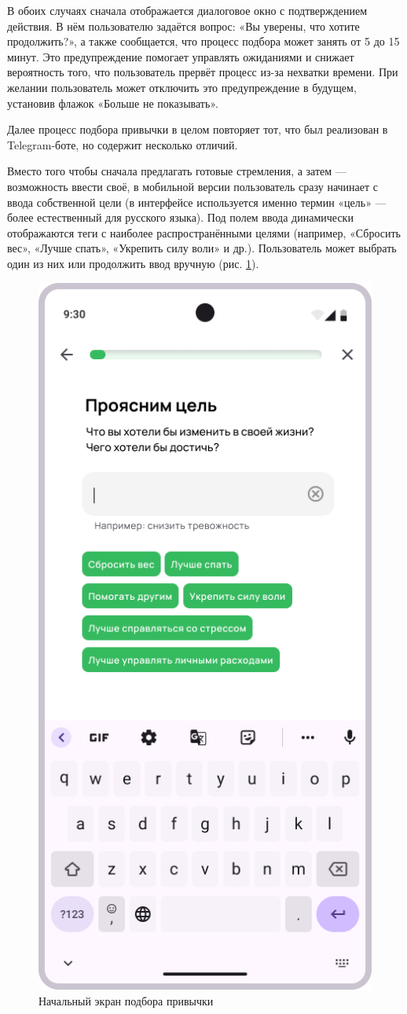 \documentclass[pdflatex,sn-mathphys-num]{sn-jnl}%
\theoremstyle{thmstyleone}%
\theoremstyle{thmstyletwo}%
\theoremstyle{thmstylethree}%
\begin{document}
В обоих случаях сначала отображается диалоговое окно с подтверждением действия. В нём пользователю задаётся вопрос:
«Вы уверены, что хотите продолжить?», а также сообщается, что процесс подбора может занять от 5 до 15 минут. Это предупреждение помогает управлять ожиданиями и снижает вероятность того, что пользователь прервёт процесс из-за нехватки времени. При желании пользователь может отключить это предупреждение в будущем, установив флажок «Больше не показывать».

Далее процесс подбора привычки в целом повторяет тот, что был реализован в Telegram-боте, но содержит несколько отличий.

Вместо того чтобы сначала предлагать готовые стремления, а затем — возможность ввести своё, в мобильной версии пользователь сразу начинает с ввода собственной цели (в интерфейсе используется именно термин «цель» — более естественный для русского языка). Под полем ввода динамически отображаются теги с наиболее распространёнными целями (например, «Сбросить вес», «Лучше спать», «Укрепить силу воли» и др.). Пользователь может выбрать один из них или продолжить ввод вручную (рис. \ref{fig:Onb_pick_1}).

\begin{figure}
    \centering
    \includegraphics[width=0.5\linewidth]{figures/App/Onb_pick_1.png}
    \caption{Начальный экран подбора привычки}
    \label{fig:Onb_pick_1}
\end{figure}
\end{document}
